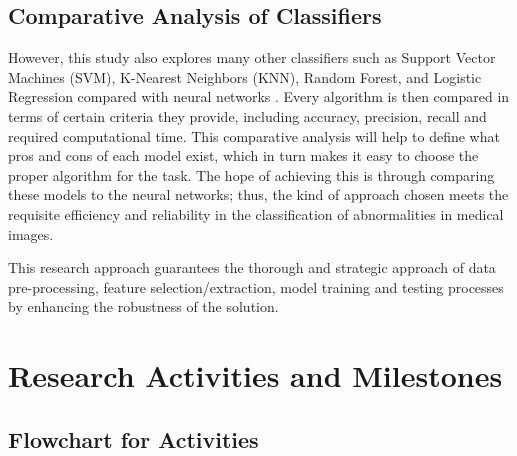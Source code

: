 \documentclass[a4paper, 12pt]{article}
\begin{document}
\subsection{ Comparative Analysis of Classifiers }

However, this study also explores many other classifiers such as Support Vector Machines (SVM), K-Nearest Neighbors (KNN), Random Forest, and Logistic Regression compared with neural networks . Every algorithm is then compared in terms of certain criteria they provide, including accuracy, precision, recall and required computational time. This comparative analysis will help to define what pros and cons of each model exist, which in turn makes it easy to choose the proper algorithm for the task. The hope of achieving this is through comparing these models to the neural networks; thus, the kind of approach chosen meets the requisite efficiency and reliability in the classification of abnormalities in medical images.

This research approach guarantees the thorough and strategic approach of data pre-processing, feature selection/extraction, model training and testing processes by enhancing the robustness of the solution.

\clearpage

\section{Research Activities and Milestones}

\subsection{Flowchart for Activities}
\end{document}
